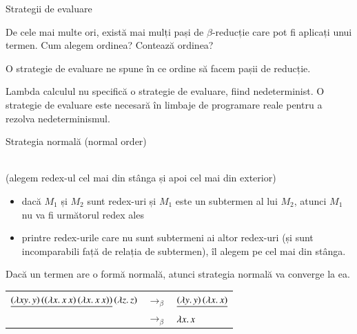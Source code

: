 \documentclass[xcolor=pdftex,romanian,colorlinks]{beamer}
\begin{document}
\begin{frame}[fragile]{Strategii de evaluare}

De cele mai multe ori, există mai mulți pași de $\beta$-reducție care pot fi aplicați unui termen. Cum alegem ordinea? Contează ordinea?

\medskip  
O \alert{strategie de evaluare} ne spune în ce ordine să facem pașii de reducție.


\medskip  
Lambda calculul nu specifică o strategie de evaluare, fiind \alert{nedeterminist}. O strategie de evaluare este necesară în limbaje de programare reale pentru a rezolva nedeterminismul.

\end{frame}

\begin{frame}[fragile]{Strategia normală (normal order)}

\\
(alegem redex-ul cel mai din stânga și apoi cel mai din exterior)

\begin{itemize}
	\item dacă $M_1$ și $M_2$ sunt redex-uri  și $M_1$ este un subtermen al lui $M_2$, atunci $M_1$ {\color{False} nu} va fi următorul redex ales
	\item printre redex-urile care nu sunt subtermeni ai altor redex-uri (și sunt incomparabili față de relația de subtermen), îl alegem pe cel mai din stânga.
\end{itemize}

\alert{Dacă un termen are o formă normală, atunci strategia normală va converge la ea}.

{\footnotesize
\begin{center}
\begin{tabular}{rcl} 
$\underline{(\lambda xy.\,y)\, ((\lambda x.\,x\, x)\, (\lambda x.\,x\, x))}\, (\lambda z.\,z)$ & $\rightarrow_\beta$ & $\underline{(\lambda y.\,y)\, (\lambda x.\,x)}$ \\
&$\rightarrow_\beta$ & $\lambda x.\,x$ %
\end{tabular}
\end{center}
}

\end{frame}
\end{document}
